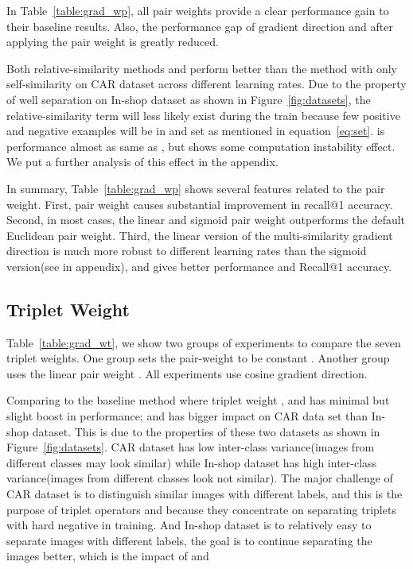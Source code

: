 \documentclass[10pt,twocolumn,letterpaper]{article}
\begin{document}
In Table~\ref{table:grad_wp}, all pair weights provide a clear performance gain to their baseline results. Also, the performance gap of gradient direction  and  after applying the pair weight is greatly reduced.

Both relative-similarity methods  and  perform better than the method with only self-similarity on CAR dataset across different learning rates. Due to the property of well separation on In-shop dataset as shown in Figure~\ref{fig:datasets}, the relative-similarity term will less likely exist during the train because few positive and negative examples will be in  and  set as mentioned in equation~\ref{eq:set}.  is performance almost as same as , but  shows some computation instability effect. We put a further analysis of this effect in the appendix.

In summary, Table~\ref{table:grad_wp} shows several features related to the pair weight.  First, pair weight causes substantial improvement in recall@1 accuracy. Second, in most cases, the linear and sigmoid pair weight outperforms the default Euclidean pair weight. Third, the linear version of the multi-similarity gradient direction is much more robust to different learning rates than the sigmoid version(see in appendix), and gives better performance and Recall@1 accuracy. 

\subsection{Triplet Weight}
\label{sec:exp_wt}
Table~\ref{table:grad_wt}, we show two groups of experiments to compare the seven triplet weights. One group sets the pair-weight to be constant .  Another group uses the linear pair weight . All experiments use cosine gradient direction. 

Comparing to the baseline method where triplet weight ,  and  has minimal but slight boost in performance;  and  has bigger impact on CAR data set than In-shop dataset. This is due to the properties of these two datasets as shown in Figure~\ref{fig:datasets}. CAR dataset has low inter-class variance(images from different classes may look similar) while In-shop dataset has high inter-class variance(images from different classes look not similar). The major challenge of CAR dataset is to distinguish similar images with different labels, and this is the purpose of triplet operators  and  because they concentrate on separating triplets with hard negative in training.  And In-shop dataset is to relatively easy to separate images with different labels, the goal is to continue separating the images better, which is the impact of  and 
\end{document}
